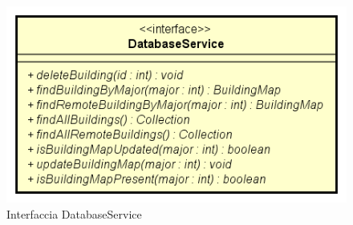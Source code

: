 \documentclass[../DefinizioneDiProdotto.tex]{subfiles}
\begin{document}
    \begin{figure}[H]
        \centering
        \includegraphics{img/DatabaseService.png}
        \caption{Interfaccia DatabaseService}\label{fig:model::dataaccess::service::DatabaseService} 
    \end{figure}
\end{document}

